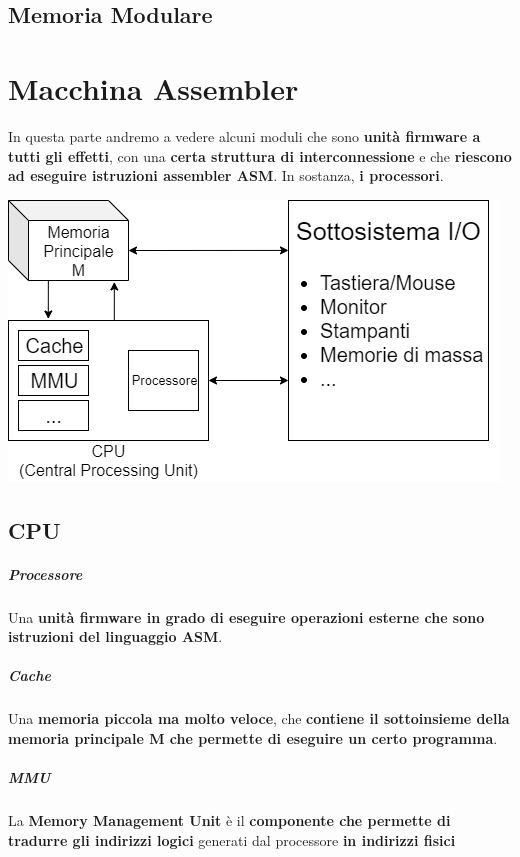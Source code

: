 \documentclass[10pt]{report}
\begin{document}
\section{Memoria Modulare}
\pagebreak
\chapter{Macchina Assembler}
In questa parte andremo a vedere alcuni moduli che sono \textbf{unità firmware a tutti gli effetti}, con una \textbf{certa struttura di interconnessione} e che \textbf{riescono ad eseguire istruzioni assembler ASM}. In sostanza, \textbf{i processori}.
\begin{center}
\includegraphics[scale=0.7]{macchinaassemblerschema.png}
\end{center}
\section{CPU}
\paragraph{Processore} Una \textbf{unità firmware in grado di eseguire operazioni esterne che sono istruzioni del linguaggio ASM}.
\paragraph{Cache} Una \textbf{memoria piccola ma molto veloce}, che \textbf{contiene il sottoinsieme della memoria principale M che permette di eseguire un certo programma}.
\paragraph{MMU} La \textbf{Memory Management Unit} è il \textbf{componente che permette di tradurre gli indirizzi logici} generati dal processore \textbf{in indirizzi fisici}
\end{document}
